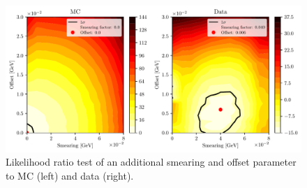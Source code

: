 \begin{figure}[H]
	\centering
	\captionsetup{width=0.8\linewidth}
	\includegraphics[width=\linewidth]{fig/smearing_offset}
	\caption{Likelihood ratio test of an additional smearing and offset parameter to MC (left) and data (right).}
	\label{fig:smearing_offset}
\end{figure}


